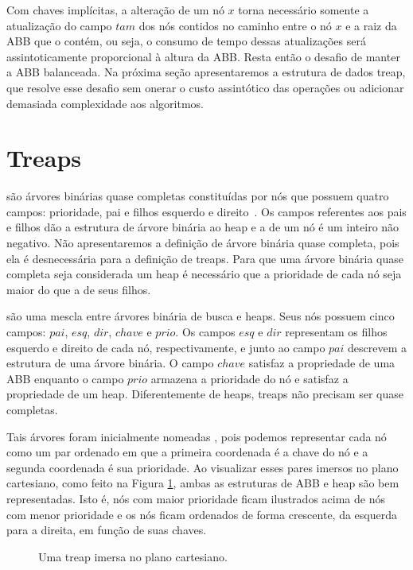 Com chaves implícitas, a alteração de um nó $x$ torna necessário somente a atualização do campo $tam$ dos nós contidos no caminho entre o nó $x$ e a raiz da ABB que o contém, ou seja, o consumo de tempo dessas atualizações será assintoticamente proporcional à altura da ABB. Resta então o desafio de manter a ABB balanceada. Na próxima seção apresentaremos a estrutura de dados treap, que resolve esse desafio sem onerar o custo assintótico das operações ou adicionar demasiada complexidade aos algoritmos.

\section{Treaps}

 são árvores binárias quase completas constituídas por nós que possuem quatro campos: prioridade, pai e filhos esquerdo e direito~\cite{CLRS}. Os campos referentes aos pais e filhos dão a estrutura de árvore binária ao heap e a  de um nó é um inteiro não negativo. Não apresentaremos a definição de árvore binária quase completa, pois ela é desnecessária para a definição de treaps. Para que uma árvore binária quase completa seja considerada um heap é necessário que a prioridade de cada nó seja maior do que a de seus filhos.

 são uma mescla entre árvores binária de busca e heaps. Seus nós possuem cinco campos: $pai$, $esq$, $dir$, $chave$ e $prio$. Os campos $esq$ e $dir$ representam os filhos esquerdo e direito de cada nó, respectivamente, e junto ao campo $pai$ descrevem a estrutura de uma árvore binária. O campo $chave$ satisfaz a propriedade de uma ABB enquanto o campo $prio$ armazena a prioridade do nó e satisfaz a propriedade de um heap. Diferentemente de heaps, treaps não precisam ser quase completas.


Tais árvores foram inicialmente nomeadas  \cite{Vuillemin1980AUL}, pois podemos representar cada nó como um par ordenado em que a primeira coordenada é a chave do nó e a segunda coordenada é sua prioridade. Ao visualizar esses pares imersos no plano cartesiano, como feito na Figura \ref{fig:TREAP}, ambas as estruturas de ABB e heap são bem representadas. Isto é, nós com maior prioridade ficam ilustrados acima de nós com menor prioridade e os nós ficam ordenados de forma crescente, da esquerda para a direita, em função de suas chaves.

\begin{figure}[htb]
\centering

\caption{Uma treap imersa no plano cartesiano.}
\label{fig:TREAP}
\end{figure}

